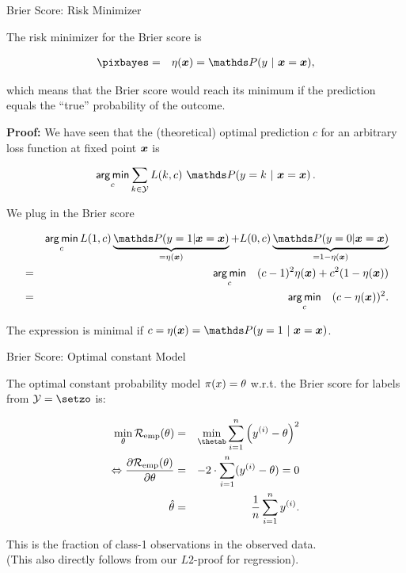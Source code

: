 \begin{vbframe}{Brier Score: Risk Minimizer}

The risk minimizer for the Brier score is 

\begin{eqnarray*}
\pixbayes &=& \eta(\xv) = \P(y~|~\xv = \xv),
\end{eqnarray*}

which means that the Brier score would reach its minimum if the prediction equals the \enquote{true} probability of the outcome. 

\lz 

\textbf{Proof: }We have seen that the (theoretical) optimal prediction $c$ for an arbitrary loss function at fixed point $\bm{x}$ is

$$
\argmin_{c} \sum_{k \in \Yspace} L(k, c) ~ \P(y = k~|~ \xv = \xv)\,.
$$

We plug in the Brier score

\vspace*{-0.3cm}

\begin{eqnarray*}
	&& \argmin_c L(1, c) \underbrace{\P(y = 1| \xv = \xv)}_{= \eta(\xv)} + L(0, c) \underbrace{\P(y = 0| \xv = \xv)}_{= 1 - \eta(\xv)} \\ 
	&=&  \argmin_c \quad (c - 1)^2 \eta(\xv) + c^2 (1 - \eta(\xv))\\
	&=&  \argmin_c \quad (c - \eta(\xv))^2.
\end{eqnarray*}

The expression is minimal if $c = \eta(\xv) = \P(y = 1~|~\xv = \xv)$.

\end{vbframe}

\begin{vbframe}{Brier Score: Optimal constant Model}

The optimal constant probability model $\pi(x) = \theta$ w.r.t. the Brier score for labels from $\Yspace = \setzo$ is:

\begin{eqnarray*}
  \min_{\theta} \riske(\theta) &=& \min_{\thetab} \sumin \left(\yi - \theta\right)^2 \\
  \Leftrightarrow \frac{\partial \riske(\theta)}{\partial \theta} &=& - 2 \cdot \sumin (\yi - \theta) = 0 \\
  \hat \theta &=& \frac{1}{n} \sumin \yi.   
\end{eqnarray*}

This is the fraction of class-1 observations in the observed data.\\
(This also directly follows from our $L2$-proof for regression).

\end{vbframe}

